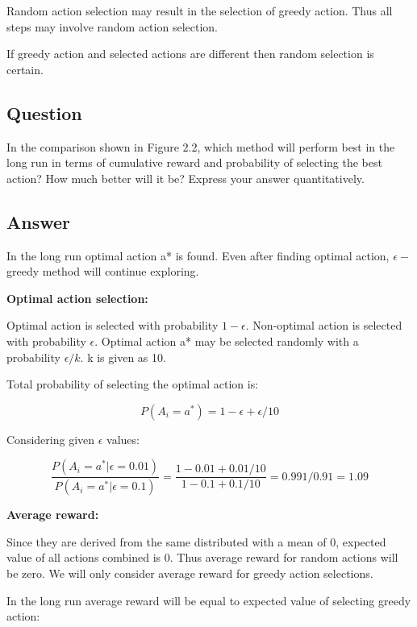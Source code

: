 \documentclass{article}
\begin{document}
    Random action selection may result in the selection of greedy action.
    Thus all steps may involve random action selection.

    If greedy action and selected actions are different then random selection is certain.

    \subsection{Question}

    In the comparison shown in Figure 2.2, which method will perform best in the long run in
    terms of cumulative reward and probability of selecting the best action? How much better will it be?
    Express your answer quantitatively.

    \subsection*{Answer}

    In the long run optimal action a* is found.
    Even after finding optimal action, $\epsilon-$greedy method will continue exploring.

    \textbf{Optimal action selection:}

    Optimal action is selected with probability $1-\epsilon$.
    Non-optimal action is selected with probability $\epsilon$.
    Optimal action a* may be selected randomly with a probability $\epsilon/k$.
    k is given as 10.

    Total probability of selecting the optimal action is:

    \begin{equation}
        P(A_i=a^*) = 1-\epsilon + \epsilon/10
    \end{equation}

    Considering given $\epsilon$ values:

    \begin{equation}
        \frac{P(A_i=a^*|\epsilon=0.01 ) }{P(A_i=a^*|\epsilon=0.1 ) }= \frac{1-0.01 + 0.01/10}{1-0.1 + 0.1/10} = 0.991 /0.91 = 1.09
    \end{equation}

    \textbf{Average reward:}

    Since they are derived from the same distributed with a mean of 0, expected value of all actions combined is 0.
    Thus average reward for random actions will be zero.
    We will only consider average reward for greedy action selections.

    In the long run average reward will be equal to expected value of selecting greedy action:
\end{document}
